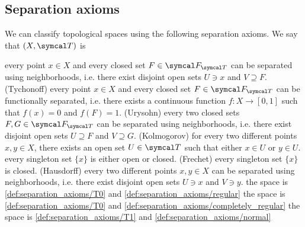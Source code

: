 \subsection{Separation axioms}\label{sec:separation_axioms}

\begin{definition}\label{def:separation_axioms}
  We can classify topological spaces using the following separation axioms. We say that \( (X, \Cal{T}) \) is

  \begin{description}
     every point \( x \in X \) and every closed set \( F \in \Cal{F}_{\Cal{T}} \) can be separated using neighborhoods, i.e. there exist disjoint open sets \( U \ni x \) and \( V \supseteq F \).
     (Tychonoff) every point \( x \in X \) and every closed set \( F \in \Cal{F}_{\Cal{T}} \) can be functionally separated, i.e. there exists a continuous function \( f: X \to [0, 1] \) such that \( f(x) = 0 \) and \( f(F) = 1 \).
     (Urysohn) every two closed sets \( F, G \in \Cal{F}_{\Cal{T}} \) can be separated using neighborhoods, i.e. there exist disjoint open sets \( U \supseteq F \) and \( V \supseteq G \).
     (Kolmogorov) for every two different points \( x, y \in X \), there exists an open set \( U \in \Cal{T} \) such that either \( x \in U \) or \( y \in U \).
     every singleton set \( \{ x \} \) is either open or closed.
     (Frechet) every singleton set \( \{ x \} \) is closed.
     (Hausdorff) every two different points \( x, y \in X \) can be separated using neighborhoods, i.e. there exist disjoint open sets \( U \ni x \) and \( V \ni y \).
     the space is \ref{def:separation_axioms/T0} and \ref{def:separation_axioms/regular}
     the space is \ref{def:separation_axioms/T0} and \ref{def:separation_axioms/completely_regular}
     the space is \ref{def:separation_axioms/T1} and \ref{def:separation_axioms/normal}
  \end{description}
\end{definition}

